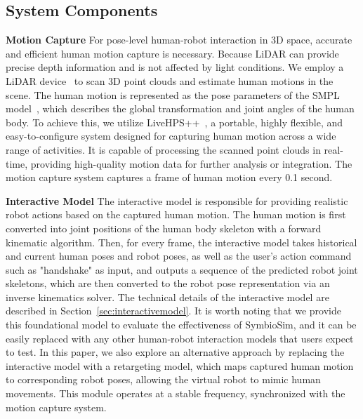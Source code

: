 \subsection{System Components}
\label{sec:components}

\textbf{Motion Capture} For pose-level human-robot interaction in 3D space, accurate and efficient human motion capture is necessary. Because LiDAR can provide precise depth information and is not affected by light conditions. We employ a LiDAR device~\cite{OusterLidar2022} to scan 3D point clouds and estimate human motions in the scene. The human motion is represented as the pose parameters of the SMPL model~\cite{SMPL}, which describes the global transformation and joint angles of the human body. To achieve this, we utilize LiveHPS++~\cite{ren2025livehps++}, a portable, highly flexible, and easy-to-configure system designed for capturing human motion across a wide range of activities. It is capable of processing the scanned point clouds in real-time, providing high-quality motion data for further analysis or integration. 
The motion capture system captures a frame of human motion every 0.1 second.

\textbf{Interactive Model} The interactive model is responsible for providing realistic robot actions based on the captured human motion. The human motion is first converted into joint positions of the human body skeleton with a forward kinematic algorithm. Then, for every frame, the interactive model takes historical and current human poses and robot poses, as well as the user's action command such as "handshake" as input, and outputs a sequence of the predicted robot joint skeletons, which are then converted to the robot pose representation via an inverse kinematics solver. The technical details of the interactive model are described in Section~\ref{sec:interactivemodel}. 
It is worth noting that we provide this foundational model to evaluate the effectiveness of SymbioSim, and it can be easily replaced with any other human-robot interaction models that users expect to test. In this paper, we also explore an alternative approach by replacing the interactive model with a retargeting model, which maps captured human motion to corresponding robot poses, allowing the virtual robot to mimic human movements. 
This module operates at a stable frequency, synchronized with the motion capture system.

